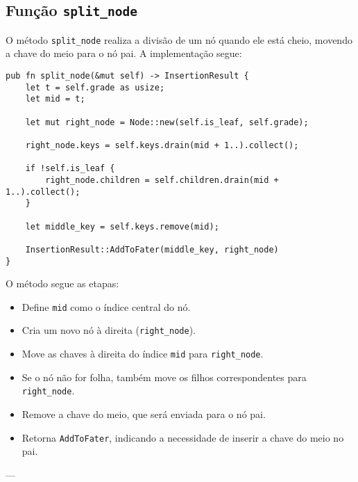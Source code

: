 \subsection{Função \texttt{split\_node}}

O método \texttt{split\_node} realiza a divisão de um nó quando ele está cheio, movendo a chave do meio para o nó pai. A implementação segue:

\begin{lstlisting}
pub fn split_node(&mut self) -> InsertionResult {
    let t = self.grade as usize;
    let mid = t;

    let mut right_node = Node::new(self.is_leaf, self.grade);

    right_node.keys = self.keys.drain(mid + 1..).collect();

    if !self.is_leaf {
        right_node.children = self.children.drain(mid + 1..).collect();
    }

    let middle_key = self.keys.remove(mid);

    InsertionResult::AddToFater(middle_key, right_node)
}
\end{lstlisting}

O método segue as etapas:

\begin{itemize}
    \item Define \texttt{mid} como o índice central do nó.
    \item Cria um novo nó à direita (\texttt{right\_node}).
    \item Move as chaves à direita do índice \texttt{mid} para \texttt{right\_node}.
    \item Se o nó não for folha, também move os filhos correspondentes para \texttt{right\_node}.
    \item Remove a chave do meio, que será enviada para o nó pai.
    \item Retorna \texttt{AddToFater}, indicando a necessidade de inserir a chave do meio no pai.
\end{itemize}

--- 
